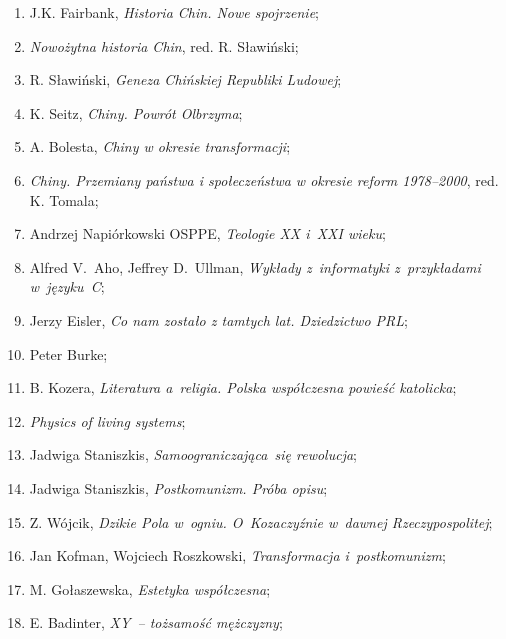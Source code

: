\documentclass[a4paper,11pt]{article}
\begin{document}
\begin{enumerate}
\item J.K. Fairbank, \textit{Historia Chin. Nowe spojrzenie};

\item \textit{Nowożytna historia Chin}, red. R. Sławiński;

\item R. Sławiński, \textit{Geneza Chińskiej Republiki Ludowej};

\item K. Seitz, \textit{Chiny. Powrót Olbrzyma};

\item A. Bolesta, \textit{Chiny w okresie transformacji};

\item \textit{Chiny. Przemiany państwa i społeczeństwa w okresie reform
    1978--2000}, red. K. Tomala;

\item Andrzej Napiórkowski OSPPE, \textit{Teologie XX i~XXI wieku};

\item Alfred V.~Aho, Jeffrey D.~Ullman, \textit{Wykłady z~informatyki
    z~przykładami w~języku~C};

\item Jerzy Eisler, \textit{Co nam zostało z tamtych lat. Dziedzictwo
    PRL};

\item Peter Burke;

\item B. Kozera, \textit{Literatura a~religia. Polska współczesna
    powieść katolicka};

\item \textit{Physics of living systems};

\item Jadwiga Staniszkis, \textit{Samoograniczająca~się rewolucja};

\item Jadwiga Staniszkis, \textit{Postkomunizm. Próba opisu};

\item Z. Wójcik, \textit{Dzikie Pola w~ogniu. O~Kozaczyźnie w~dawnej
    Rzeczypospolitej};

\item Jan Kofman, Wojciech Roszkowski, \textit{Transformacja
    i~postkomunizm};

\item M. Gołaszewska, \textit{Estetyka współczesna};

\item E. Badinter, \textit{XY~-- tożsamość mężczyzny};


\end{enumerate}
\end{document}
